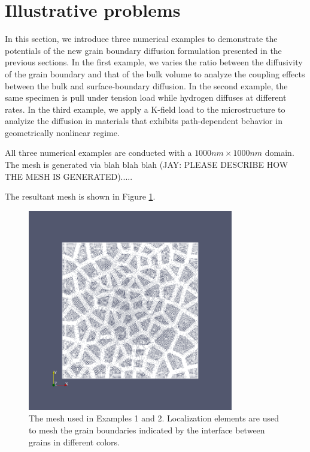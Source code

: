 \documentclass[10pt]{elsarticle}
\begin{document}
\section{Illustrative problems}
In this section, we introduce three numerical examples to demonstrate the potentials of the 
new grain boundary diffusion formulation presented in the previous sections.
In the first example, we varies the ratio between the diffusivity of the grain boundary 
and that of the bulk volume to analyze the coupling effects between the bulk
and surface-boundary diffusion. In the second example, the same specimen is pull 
under tension load while hydrogen diffuses at different rates. In the third example,
we apply a K-field load to the microstructure to analyize the diffusion in materials that 
exhibits path-dependent behavior in geometrically nonlinear regime.  

All three numerical examples are conducted with a $1000nm \times 1000nm$ domain. The mesh is generated via blah blah blah (JAY: PLEASE DESCRIBE HOW THE MESH IS GENERATED)..... 

The resultant mesh is shown in Figure \ref{fig:mesh}. 
\begin{figure}[h!]
  \centering
    \includegraphics[trim = 0mm 0mm 0mm 0mm, clip,width=0.8\textwidth]{images/mesh_2D.png}
    \caption{The mesh used in Examples 1 and 2. Localization elements are
    used to mesh the grain boundaries indicated by the interface between grains 
    in different colors.}
    \label{fig:mesh}
\end{figure}
\end{document}
